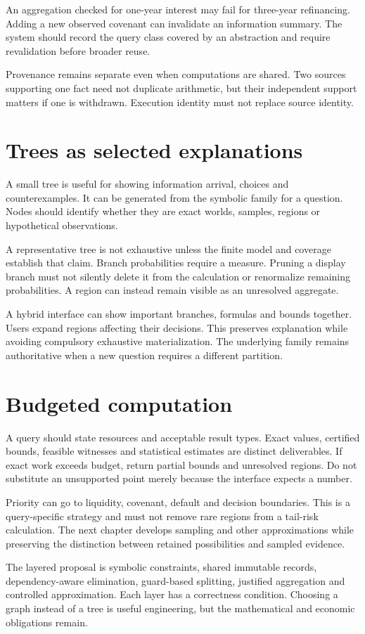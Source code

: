 An aggregation checked for one-year interest may fail for three-year refinancing. Adding a new observed covenant can invalidate an information summary. The system should record the query class covered by an abstraction and require revalidation before broader reuse.

Provenance remains separate even when computations are shared. Two sources supporting one fact need not duplicate arithmetic, but their independent support matters if one is withdrawn. Execution identity must not replace source identity.

\section{Trees as selected explanations}
A small tree is useful for showing information arrival, choices and counterexamples. It can be generated from the symbolic family for a question. Nodes should identify whether they are exact worlds, samples, regions or hypothetical observations.

A representative tree is not exhaustive unless the finite model and coverage establish that claim. Branch probabilities require a measure. Pruning a display branch must not silently delete it from the calculation or renormalize remaining probabilities. A region can instead remain visible as an unresolved aggregate.

A hybrid interface can show important branches, formulas and bounds together. Users expand regions affecting their decisions. This preserves explanation while avoiding compulsory exhaustive materialization. The underlying family remains authoritative when a new question requires a different partition.

\section{Budgeted computation}
A query should state resources and acceptable result types. Exact values, certified bounds, feasible witnesses and statistical estimates are distinct deliverables. If exact work exceeds budget, return partial bounds and unresolved regions. Do not substitute an unsupported point merely because the interface expects a number.

Priority can go to liquidity, covenant, default and decision boundaries. This is a query-specific strategy and must not remove rare regions from a tail-risk calculation. The next chapter develops sampling and other approximations while preserving the distinction between retained possibilities and sampled evidence.

The layered proposal is symbolic constraints, shared immutable records, dependency-aware elimination, guard-based splitting, justified aggregation and controlled approximation. Each layer has a correctness condition. Choosing a graph instead of a tree is useful engineering, but the mathematical and economic obligations remain.

